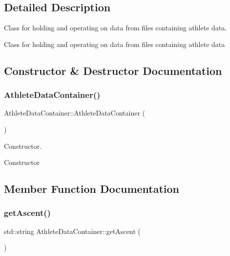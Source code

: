 \subsection{Detailed Description}
Class for holding and operating on data from files containing athlete data. 

Class for holding and operating on data from files containing athlete data 

\subsection{Constructor \& Destructor Documentation}
\mbox{\label{classAthleteDataContainer_ad268a2095024e3d0f3dfb552baad1e55}} 
\subsubsection{\texorpdfstring{AthleteDataContainer()}{AthleteDataContainer()}}
{\footnotesize\ttfamily Athlete\+Data\+Container\+::\+Athlete\+Data\+Container (\begin{DoxyParamCaption}{ }\end{DoxyParamCaption})}



Constructor. 

Constructor 

\subsection{Member Function Documentation}
\mbox{\label{classAthleteDataContainer_a655c028c325e6af60e79943738ef46fa}} 
\subsubsection{\texorpdfstring{getAscent()}{getAscent()}}
{\footnotesize\ttfamily std\+::string Athlete\+Data\+Container\+::get\+Ascent (\begin{DoxyParamCaption}{ }\end{DoxyParamCaption})}



